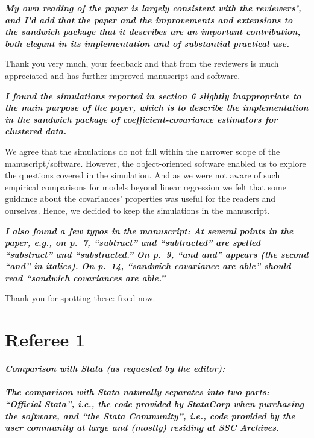 \documentclass[10pt,a4paper]{article}
\begin{document}
\medskip

\textbf{\textit{My own reading of the paper is largely consistent with the reviewers', and
I'd add that the paper and the improvements and extensions to the sandwich
package that it describes are an important contribution, both elegant in its
implementation and of substantial practical use.}}

\medskip

Thank you very much, your feedback and that from the reviewers is much appreciated
and has further improved manuscript and software.

\medskip

\textbf{\textit{I found the simulations reported in section 6 slightly inappropriate to the
main purpose of the paper, which is to describe the implementation in the
sandwich package of coefficient-covariance estimators for clustered data.}}

\medskip

We agree that the simulations do not fall within the narrower scope of the manuscript/software.
However, the object-oriented software enabled us to explore the questions covered in the
simulation. And as we were not aware of such empirical comparisons for models beyond
linear regression we felt that some guidance about the covariances' properties was useful
for the readers and ourselves. Hence, we decided to keep the simulations in the manuscript.

\medskip

\textbf{\textit{I also found a few typos in the manuscript: At several points in the paper,
e.g., on p.~7, ``subtract'' and ``subtracted'' are spelled ``substract'' and
``substracted.'' On p.~9, ``and and'' appears (the second ``and'' in italics). 
On p.~14, ``sandwich covariance are able'' should read ``sandwich covariances
are able.''}}

\medskip

Thank you for spotting these: fixed now.


\bigskip

\section*{Referee 1}

\textbf{\textit{Comparison with Stata (as requested by the editor):
\\ \\ 
The comparison with Stata naturally separates into two parts: ``Official Stata'', i.e., the code provided by StataCorp when purchasing the software, and ``the Stata Community'', i.e., code provided by the user community at large and (mostly) residing at SSC Archives.}}
\end{document}

